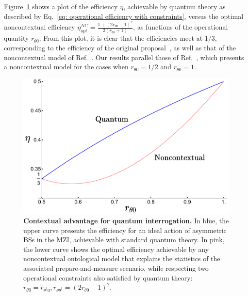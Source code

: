 \documentclass[a4paper,twocolumn,11pt,accepted=2024-01-17]{quantumarticle}
\begin{document}
Figure~\ref{fig: efficiency standard interrogation} shows a plot of the efficiency $\eta$, achievable by quantum theory  as described by Eq.~\eqref{eq: operational efficiency with constraints}, versus the optimal noncontextual efficiency $\eta^{NC}_{opt} = \frac{1 + (2r_{\theta 0}-1)^2}{2(r_{\theta 0}+1)}$, as functions of the operational quantity $r_{\theta 0}$. From this plot, it is clear that the efficiencies meet at $1/3$, corresponding to the efficiency of the original proposal~\cite{elitzur1993quantum}, as well as that of the noncontextual model of Ref.~\cite{catani2021interference}. Our results parallel those of Ref.~\cite{catani2021interference}, which presents a noncontextual model for the cases when $r_{\theta 0}=1/2$ and $r_{\theta 0}=1$. 




\begin{figure}[tb]
    \centering
    \includegraphics[width=\columnwidth]{Acc_Figures/ContextualAdvantage.png}
    \caption{\textbf{Contextual advantage for quantum interrogation.} In blue, the upper curve presents the efficiency for an ideal action of asymmetric BSs in the MZI, achievable with standard quantum theory. In pink, the lower curve shows the optimal efficiency achievable by any noncontextual ontological model that explains the statistics of the associated prepare-and-measure scenario, while respecting two operational constraints also satisfied by quantum theory: $r_{\theta 0} = r_{\theta^\dagger 0}, r_{\theta \theta^\dagger} = (2r_{\theta 0}-1)^2$.}
    \label{fig: efficiency standard interrogation}
\end{figure}
\end{document}
